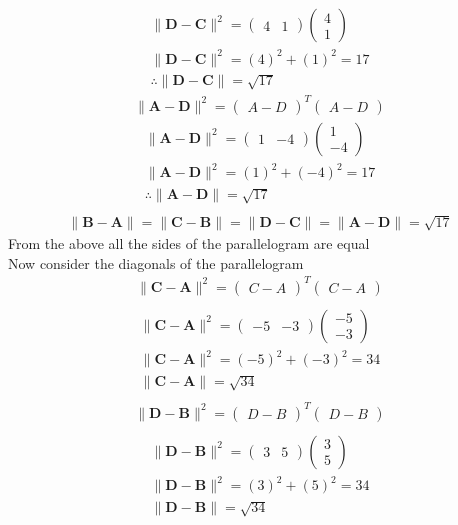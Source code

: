 \documentclass{beamer}
\theoremstyle{remark}
\newcommand{\myvec}[1]{\ensuremath{\begin{pmatrix}#1\end{pmatrix}}}
\let\vec\mathbf
\numberwithin{equation}{section}
\begin{document}
        \begin{align}
            \|\vec{D-C}\|^2=\myvec{4 & 1}\myvec{4\\1}\\
            \|\vec{D-C}\|^2=(4)^2+(1)^2=17\\
            \therefore \|\vec{D-C}\|=\sqrt{17}
        \end{align}
        \begin{align}
            \|\vec{A-D}\|^2=\myvec{A-D}^T\myvec{A-D}
        \end{align}
        \begin{align}
            \|\vec{A-D}\|^2=\myvec{1 & -4}\myvec{1\\-4}\\
            \|\vec{A-D}\|^2={(1)^2+(-4)^2}=17\\
            \therefore \|\vec{A-D}\|=\sqrt{17}\\
        \end{align}
        \begin{align}
            \|\vec{B-A}\|=\|\vec{C-B}\|=\|\vec{D-C}\|=\|\vec{A-D}\|=\sqrt{17}
        \end{align}
        From the above all the sides of the parallelogram are equal\\
        Now consider the diagonals of the parallelogram\\
        \begin{align}
            \|\vec{C-A}\|^2=\myvec{C-A}^T\myvec{C-A}\\
        \end{align}
        \begin{align}
            \|\vec{C-A}\|^2=\myvec{-5 & -3}\myvec{-5\\-3}\\
            \|\vec{C-A}\|^2=(-5)^2+(-3)^2=34\\
            \|\vec{C-A}\|=\sqrt{34}\\
        \end{align}
        \begin{align}
            \|\vec{D-B}\|^2=\myvec{D-B}^T\myvec{D-B}\\
            \end{align}
            \begin{align}
            \|\vec{D-B}\|^2=\myvec{3 & 5}\myvec{3\\5}\\
            \|\vec{D-B}\|^2=(3)^2+(5)^2=34\\
            \|\vec{D-B}\|=\sqrt{34}\\
        \end{align}
\end{document}
